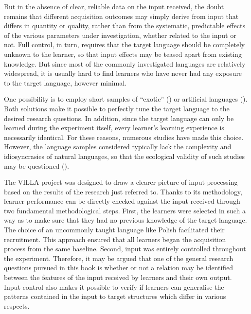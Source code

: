But in the absence of clear, reliable data on the input received, the doubt remains that different acquisition outcomes may simply derive from input that differs in quantity or quality, rather than from the systematic, predictable effects of the various parameters under investigation, whether related to the input or not. Full control, in turn, requires that the target language should be completely unknown to the learner, so that input effects may be teased apart from existing knowledge. But since most of the commonly investigated languages are relatively widespread, it is usually hard to find learners who have never had any exposure to the target language, however minimal. 

One possibility is to employ short samples of “exotic” (\citealt{GullbergEtAl2010, Carroll2012First, Carroll2012Input, Carroll2012Segmentation, CarrollWidjaja2013, Carroll2014}) or artificial languages (\citealt{HulstijnDeKeyser1997, Williams2010}). Both solutions make it possible to perfectly tune the target language to the desired research questions. In addition, since the target language can only be learned during the experiment itself, every learner’s learning experience is necessarily identical. For these reasons, numerous studies have made this choice. However, the language samples considered typically lack the complexity and idiosyncrasies of natural languages, so that the ecological validity of such studies may be questioned (\citealt{Hulstijn1989, Robinson2010}).

The VILLA project was designed to draw a clearer picture of input processing based on the results of the research just referred to. Thanks to its methodology, learner performance can be directly checked against the input received through two fundamental methodological steps. First, the learners were selected in such a way as to make sure that they had no previous knowledge of the target language. The choice of an uncommonly taught language like Polish facilitated their recruitment. This approach ensured that all learners began the acquisition process from the same baseline. Second, input was entirely controlled throughout the experiment. Therefore, it may be argued that one of the general research questions pursued in this book is whether or not a relation may be identified between the features of the input received by learners and their own output. Input control also makes it possible to verify if learners can generalise the patterns contained in the input to target structures which differ in various respects. 

